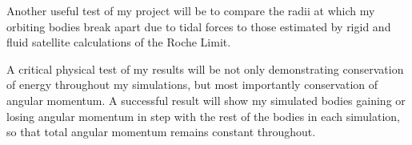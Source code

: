 \documentclass{article}
\begin{document}
Another useful test of my project will be to compare the radii at which my orbiting bodies break apart due to tidal forces to those estimated by rigid and fluid satellite calculations of the Roche Limit. 

A critical physical test of my results will be not only demonstrating conservation of energy throughout my simulations, but most importantly conservation of angular momentum. A successful result will show my simulated bodies gaining or losing angular momentum in step with the rest of the bodies in each simulation, so that total angular momentum remains constant throughout. 
\end{document}
